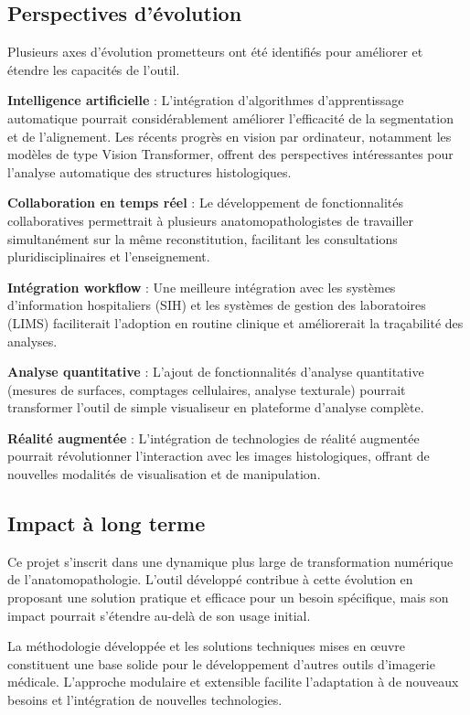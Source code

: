 \documentclass[12pt,a4paper]{report}
\begin{document}
\subsection{Perspectives d'évolution}

Plusieurs axes d'évolution prometteurs ont été identifiés pour améliorer et étendre les capacités de l'outil.

\textbf{Intelligence artificielle} : L'intégration d'algorithmes d'apprentissage automatique pourrait considérablement améliorer l'efficacité de la segmentation et de l'alignement. Les récents progrès en vision par ordinateur, notamment les modèles de type Vision Transformer, offrent des perspectives intéressantes pour l'analyse automatique des structures histologiques.

\textbf{Collaboration en temps réel} : Le développement de fonctionnalités collaboratives permettrait à plusieurs anatomopathologistes de travailler simultanément sur la même reconstitution, facilitant les consultations pluridisciplinaires et l'enseignement.

\textbf{Intégration workflow} : Une meilleure intégration avec les systèmes d'information hospitaliers (SIH) et les systèmes de gestion des laboratoires (LIMS) faciliterait l'adoption en routine clinique et améliorerait la traçabilité des analyses.

\textbf{Analyse quantitative} : L'ajout de fonctionnalités d'analyse quantitative (mesures de surfaces, comptages cellulaires, analyse texturale) pourrait transformer l'outil de simple visualiseur en plateforme d'analyse complète.

\textbf{Réalité augmentée} : L'intégration de technologies de réalité augmentée pourrait révolutionner l'interaction avec les images histologiques, offrant de nouvelles modalités de visualisation et de manipulation.

\subsection{Impact à long terme}

Ce projet s'inscrit dans une dynamique plus large de transformation numérique de l'anatomopathologie. L'outil développé contribue à cette évolution en proposant une solution pratique et efficace pour un besoin spécifique, mais son impact pourrait s'étendre au-delà de son usage initial.

La méthodologie développée et les solutions techniques mises en œuvre constituent une base solide pour le développement d'autres outils d'imagerie médicale. L'approche modulaire et extensible facilite l'adaptation à de nouveaux besoins et l'intégration de nouvelles technologies.
\end{document}
